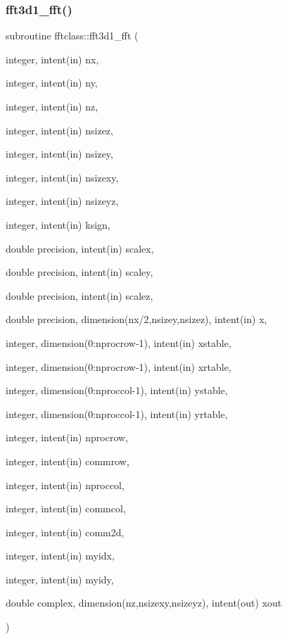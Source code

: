 \subsubsection{\texorpdfstring{fft3d1\_fft()}{fft3d1\_fft()}}
{\footnotesize\ttfamily subroutine fftclass\+::fft3d1\+\_\+fft (\begin{DoxyParamCaption}\item[{integer, intent(in)}]{nx,  }\item[{integer, intent(in)}]{ny,  }\item[{integer, intent(in)}]{nz,  }\item[{integer, intent(in)}]{nsizez,  }\item[{integer, intent(in)}]{nsizey,  }\item[{integer, intent(in)}]{nsizexy,  }\item[{integer, intent(in)}]{nsizeyz,  }\item[{integer, intent(in)}]{ksign,  }\item[{double precision, intent(in)}]{scalex,  }\item[{double precision, intent(in)}]{scaley,  }\item[{double precision, intent(in)}]{scalez,  }\item[{double precision, dimension(nx/2,nsizey,nsizez), intent(in)}]{x,  }\item[{integer, dimension(0\+:nprocrow-\/1), intent(in)}]{xstable,  }\item[{integer, dimension(0\+:nprocrow-\/1), intent(in)}]{xrtable,  }\item[{integer, dimension(0\+:nproccol-\/1), intent(in)}]{ystable,  }\item[{integer, dimension(0\+:nproccol-\/1), intent(in)}]{yrtable,  }\item[{integer, intent(in)}]{nprocrow,  }\item[{integer, intent(in)}]{commrow,  }\item[{integer, intent(in)}]{nproccol,  }\item[{integer, intent(in)}]{commcol,  }\item[{integer, intent(in)}]{comm2d,  }\item[{integer, intent(in)}]{myidx,  }\item[{integer, intent(in)}]{myidy,  }\item[{double complex, dimension(nz,nsizexy,nsizeyz), intent(out)}]{xout }\end{DoxyParamCaption})}

